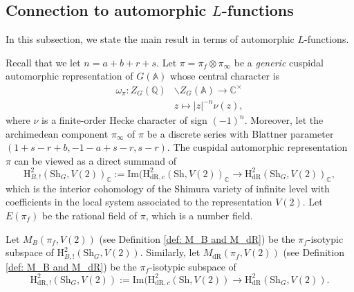 \documentclass[11pt, a4paper]{amsart}
\theoremstyle{plain}
\theoremstyle{definition}
\numberwithin{equation}{section}
\def\AAA{\mathbb{A}}
\def\CC{\mathbb{C}}
\def\QQ{\mathbb{Q}}
\newcommand{\dR}{\mathrm{dR}}
\newcommand{\Sh}{\mathrm{Sh}}
\begin{document}
\subsection{Connection to automorphic $L$-functions}
\label{SS: connection to auto L-function}
In this subsection, we state the main result in terms of automorphic $L$-functions. 

\par Recall that we let $n = a + b + r + s$. Let $\pi = \pi_{f} \otimes \pi_{\infty}$ be a \textit{generic} cuspidal automorphic representation of $G(\AAA)$ whose central character is
\begin{align*}
    \omega_{\pi} \colon Z_{G}(\QQ) & \backslash Z_{G}(\AAA) \rightarrow \CC^{\times} \\
                             & z \longmapsto |z|^{-n} \nu(z), 
\end{align*}
where $\nu$ is a finite-order Hecke character of sign $(-1)^{n}$. Moreover, let the archimedean component $\pi_{\infty}$ of $\pi$ be a discrete series with Blattner parameter $(1+s-r+b, -1-a+s-r, s-r)$. The cuspidal automorphic representation $\pi$ can be viewed as a direct summand of
\begin{equation*}
    \mathrm{H}_{B, !}^{2}(\Sh_G, V(2))_{\CC} := \mathrm{Im}(\mathrm{H}^{2}_{\dR,c}(\Sh, V(2))_{\CC} \rightarrow \mathrm{H}^{2}_{\dR}(\Sh_G,V(2))_{\CC}, 
\end{equation*}
which is the interior cohomology of the Shimura variety of infinite level with coefficients in the local system associated to the representation $V(2)$. Let $E(\pi_f)$ be the rational field of $\pi$, which is a number field. 

\par Let $M_{B}(\pi_f, V(2))$ (see Definition \ref{def: M_B and M_dR}) be the $\pi_f$-isotypic subspace of $\mathrm{H}_{B, !}^{2}(\Sh_G, V(2))$. Similarly, let $M_{\dR}(\pi_f, V(2))$ (see Definition \ref{def: M_B and M_dR}) be the $\pi_f$-isotypic subspace of 
\begin{equation*}
    \mathrm{H}_{\dR, !}^{2}(\Sh_G, V(2)) := \mathrm{Im}(\mathrm{H}^{2}_{\dR,c}(\Sh, V(2)) \rightarrow \mathrm{H}^{2}_{\dR}(\Sh_G,V(2)).
\end{equation*}
\end{document}
